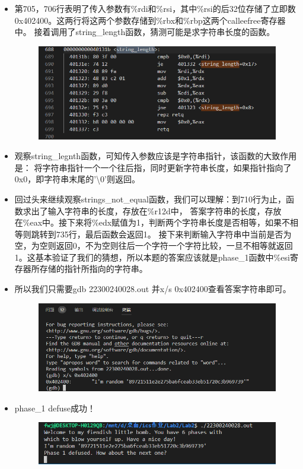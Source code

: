 \documentclass[12pt, a4paper, oneside]{ctexart}
\begin{document}
\begin{itemize}
\begin{figure}[htbp]
    \end{figure} 
    \item 第705，706行表明了传入参数有\%rdi和\%rsi，其中\%rsi的后32位存储了立即数0x402400。这两行将这两个参数存储到\%rbx和\%rbp这两个callee\-free寄存器中。
          接着调用了string\_length函数，猜测可能是求字符串长度的函数。
    \begin{figure}[htbp]
    \includegraphics[scale=0.7]{image/2.2-3.png}
    \end{figure} 
    \item 观察string\_legnth函数，可知传入参数应该是字符串指针，该函数的大致作用是：
          将字符串指针一个一个往后指，同时更新字符串长度，如果指针指向了0x0，即字符串末尾的'\textbackslash0'则返回。
    \item 回过头来继续观察strings\_not\_equal函数，我们可以理解：到710行为止，函数求出了输入字符串的长度，存放在\%r12d中，
          答案字符串的长度，存放在\%eax中。接下来将\%edx赋值为1，判断两个字符串长度是否相等，如果不相等则跳转到735行，最后函数会返回1。
          接下来判断输入字符串中当前是否为空，为空则返回0，不为空则往后一个字符一个字符比较，一旦不相等就返回1。这基本验证了我们的猜想，所以本题的答案应该就是phase\_1函数中\%esi寄存器所存储的指针所指向的字符串。
    \item 所以我们只需要gdb 22300240028.out 并x/s 0x402400查看答案字符串即可。
    \begin{figure}[htbp]
    \includegraphics[scale=0.7]{image/2.2-4.png}
    \end{figure}
    \item phase\_1 defuse成功！
    \begin{figure}[htbp]
    \includegraphics[scale=0.68]{image/2.2-5.png}
    \end{figure}
\end{itemize}
\end{document}
